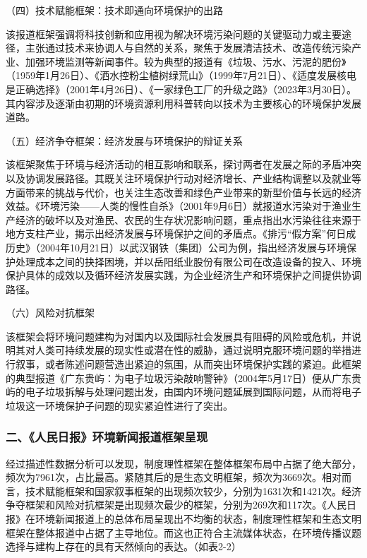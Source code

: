 （四）技术赋能框架：技术即通向环境保护的出路

该报道框架强调将科技创新和应用视为解决环境污染问题的关键驱动力或主要途径，主张通过技术来协调人与自然的关系，聚焦于发展清洁技术、改造传统污染产业、加强环境监测等新闻事件。较为典型的报道有《垃圾、污水、污泥的肥份》（1959年1月26日）、《洒水控粉尘植树绿荒山》（1999年7月21日）、《适度发展核电是正确选择》（2001年4月26日）、《一家绿色工厂的升级之路》（2023年3月30日）。其内容涉及逐渐由初期的环境资源利用科普转向以技术为主要核心的环境保护发展道路。

（五）经济争夺框架：经济发展与环境保护的辩证关系

该框架聚焦于环境与经济活动的相互影响和联系，探讨两者在发展之际的矛盾冲突以及协调发展路径。其既关注环境保护行动对经济增长、产业结构调整以及就业等方面带来的挑战与代价，也关注生态改善和绿色产业带来的新型价值与长远的经济效益。《环境污染------人类的慢性自杀》（2001年9月6日）就报道水污染对于渔业生产经济的破坏以及对渔民、农民的生存状况影响问题，重点指出水污染往往来源于地方支柱产业，揭示出经济发展与环境保护之间的矛盾点。《排污``假方案''何日成历史》（2004年10月21日）以武汉钢铁（集团）公司为例，指出经济发展与环境保护处理成本之间的抉择困境，并以岳阳纸业股份有限公司在改造设备的投入、环境保护具体的成效以及循环经济发展实践，为企业经济生产和环境保护之间提供协调路径。

（六）风险对抗框架

该框架会将环境问题建构为对国内以及国际社会发展具有阻碍的风险或危机，并说明其对人类可持续发展的现实性或潜在性的威胁，通过说明克服环境问题的举措进行叙事，或者陈述问题营造出紧迫的氛围，从而突出环境保护实践的紧迫。此框架的典型报道《广东贵屿：为电子垃圾污染敲响警钟》（2004年5月17日）便从广东贵屿的电子垃圾拆解与处理问题出发，由国内环境问题延展到国际问题，从而将电子垃圾这一环境保护子问题的现实紧迫性进行了突出。

\subsubsection{二、《人民日报》环境新闻报道框架呈现}\label{ux4e8cux4ebaux6c11ux65e5ux62a5ux73afux5883ux65b0ux95fbux62a5ux9053ux6846ux67b6ux5448ux73b0}

经过描述性数据分析可以发现，制度理性框架在整体框架布局中占据了绝大部分，频次为7961次，占比最高。紧随其后的是生态文明框架，频次为3669次。相对而言，技术赋能框架和国家叙事框架的出现频次较少，分别为1631次和1421次。经济争夺框架和风险对抗框架是出现频次最少的框架，分别为269次和117次。《人民日报》在环境新闻报道上的总体布局呈现出不均衡的状态，制度理性框架和生态文明框架在整体报道中占据了主导地位。而这也正符合主流媒体状态，在环境传播议题选择与建构上存在的具有天然倾向的表达。（如表2-2）

